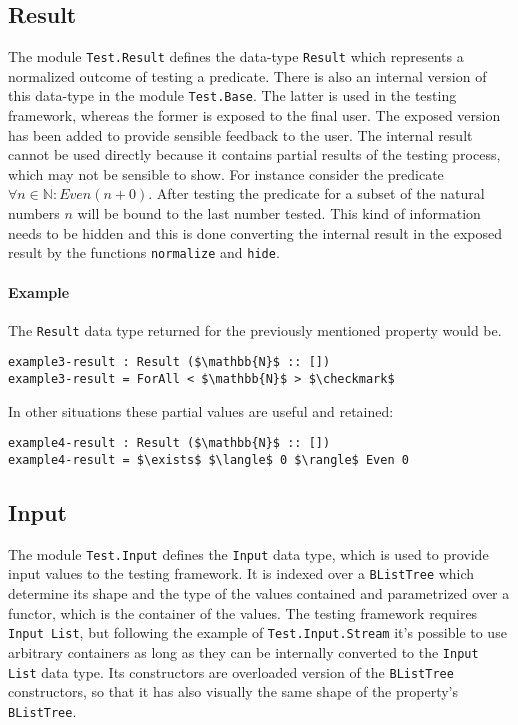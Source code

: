 \documentclass[10pt,a4paper]{article}
\begin{document}
\subsection{Result}
\label{sec:Result}
The module \texttt{Test.Result} defines the data-type \texttt{Result} which represents a normalized outcome of testing a predicate.
There is also an internal version of this data-type in the module \texttt{Test.Base}.
The latter is used in the testing framework, whereas the former is exposed to the final user. The exposed version has been added to provide sensible feedback to the user. The internal result cannot be used directly because it contains partial results of the testing process, which may not be sensible to show. For instance consider the predicate $\forall n \in \mathbb{N} : Even (n + 0)$. After testing the predicate for a subset of the natural numbers $n$ will be bound to the last number tested. This kind of information needs to be hidden and this is done converting the internal result in the exposed result by the functions \texttt{normalize} and \texttt{hide}.

\paragraph{Example} The \texttt{Result} data type returned for the previously mentioned property would be.

\begin{lstlisting}
example3-result : Result ($\mathbb{N}$ :: [])
example3-result = ForAll < $\mathbb{N}$ > $\checkmark$
\end{lstlisting}
In other situations these partial values are useful and retained:
\begin{lstlisting}
example4-result : Result ($\mathbb{N}$ :: [])
example4-result = $\exists$ $\langle$ 0 $\rangle$ Even 0
\end{lstlisting}

\subsection{Input}
The module \texttt{Test.Input} defines the \texttt{Input} data type, which is used to provide input values to the testing framework.
It is indexed over a \texttt{BListTree} which determine its shape and the type of the values contained and parametrized over a functor, which is the container of the values.
The testing framework requires \texttt{Input List}, but following the example of \texttt{Test.Input.Stream} it's possible to use arbitrary containers as long as they can be internally converted to the \texttt{Input List} data type.
Its constructors are overloaded version of the \texttt{BListTree} constructors, so that it has also visually the same shape of the property's \texttt{BListTree}.
\end{document}
